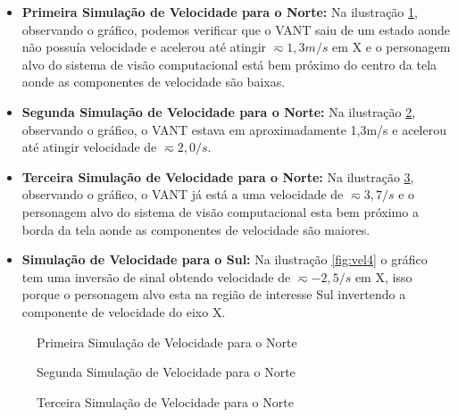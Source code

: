 \begin{itemize}
	\item \textbf{Primeira Simulação de Velocidade para o Norte:} Na ilustração \ref{fig:vel1}, observando o gráfico, podemos verificar que o VANT saiu de um estado aonde não possuía velocidade e acelerou até atingir $\displaystyle \eqsim1,3m/s$ em X e o personagem alvo do sistema de visão computacional está bem próximo do centro da tela aonde as componentes de velocidade são baixas.
	
	\item \textbf{Segunda Simulação de Velocidade para o Norte:} Na ilustração \ref{fig:vel2}, observando o gráfico, o VANT estava em aproximadamente 1,3m/s e acelerou até atingir velocidade de $\displaystyle \eqsim2,0/s$. 
	
	\item \textbf{Terceira Simulação de Velocidade para o Norte:} Na ilustração \ref{fig:vel3}, observando o gráfico, o VANT já está a uma velocidade de $\displaystyle \eqsim3,7/s$ e o personagem alvo do sistema de visão computacional esta bem próximo a borda da tela aonde as componentes de velocidade são maiores. 
	
	\item \textbf{Simulação de Velocidade para o Sul:} Na ilustração \ref{fig:vel4} o gráfico tem uma inversão de sinal obtendo velocidade de $\displaystyle \eqsim-2,5/s$ em X, isso porque o personagem alvo esta na região de interesse Sul invertendo a componente de velocidade do eixo X.
\end{itemize} 

\begin{figure}[H]
	\centering	
	\caption{Primeira Simulação de Velocidade para o Norte}
	\def\svgwidth{15cm}
	
	\label{fig:vel1}
\end{figure}

\begin{figure}[H]
	\centering	
	\caption{Segunda Simulação de Velocidade para o Norte}
	\def\svgwidth{15cm}
	
	\label{fig:vel2}
\end{figure}

\begin{figure}[H]
	\centering	
	\caption{Terceira Simulação de Velocidade para o Norte}
	\def\svgwidth{15cm}
	
	\label{fig:vel3}
\end{figure}

